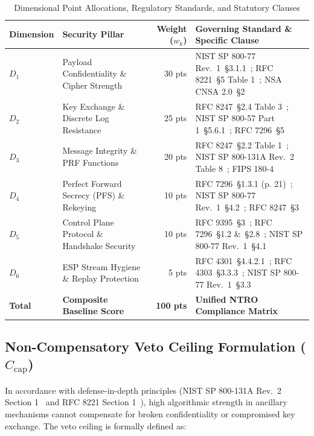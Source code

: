 \documentclass[11pt,a4paper]{article}
\begin{document}
\begin{table}[h!]
\centering
\small
\begin{tabularx}{\textwidth}{llrX}
\toprule
\textbf{Dimension} & \textbf{Security Pillar} & \textbf{Weight ($w_k$)} & \textbf{Governing Standard \& Specific Clause} \\
\midrule
$D_1$ & Payload Confidentiality \& Cipher Strength & 30 pts & NIST SP 800-77 Rev.~1~\S 3.1.1~\cite{nist800-77r1}; RFC 8221~\S 5 Table 1~\cite{rfc8221}; NSA CNSA 2.0~\S 2~\cite{cnsa2} \\
$D_2$ & Key Exchange \& Discrete Log Resistance & 25 pts & RFC 8247~\S 2.4 Table 3~\cite{rfc8247}; NIST SP 800-57 Part 1~\S 5.6.1~\cite{nist800-57p1r5}; RFC 7296~\S 5~\cite{rfc7296} \\
$D_3$ & Message Integrity \& PRF Functions & 20 pts & RFC 8247~\S 2.2 Table 1~\cite{rfc8247}; NIST SP 800-131A Rev.~2 Table 8~\cite{nist800-131ar2}; FIPS 180-4~\cite{fips180-4} \\
$D_4$ & Perfect Forward Secrecy (PFS) \& Rekeying & 10 pts & RFC 7296~\S 1.3.1 (p. 21)~\cite{rfc7296}; NIST SP 800-77 Rev.~1~\S 4.2~\cite{nist800-77r1}; RFC 8247~\S 3~\cite{rfc8247} \\
$D_5$ & Control Plane Protocol \& Handshake Security & 10 pts & RFC 9395~\S 3~\cite{rfc9395}; RFC 7296~\S 1.2 \&~\S 2.8~\cite{rfc7296}; NIST SP 800-77 Rev.~1~\S 4.1~\cite{nist800-77r1} \\
$D_6$ & ESP Stream Hygiene \& Replay Protection & 5 pts & RFC 4301~\S 4.4.2.1~\cite{rfc4301}; RFC 4303~\S 3.3.3~\cite{rfc4303}; NIST SP 800-77 Rev.~1~\S 3.3~\cite{nist800-77r1} \\
\midrule
\textbf{Total} & \textbf{Composite Baseline Score} & \textbf{100 pts} & \textbf{Unified NTRO Compliance Matrix} \\
\bottomrule
\end{tabularx}
\caption{Dimensional Point Allocations, Regulatory Standards, and Statutory Clauses}
\label{tab:weights}
\end{table}

\subsection{Non-Compensatory Veto Ceiling Formulation ($C_{\text{cap}}$)}
In accordance with defense-in-depth principles (NIST SP 800-131A Rev.~2 Section 1~\cite{nist800-131ar2} and RFC 8221 Section 1~\cite{rfc8221}), high algorithmic strength in ancillary mechanisms cannot compensate for broken confidentiality or compromised key exchange. The veto ceiling is formally defined as:
\end{document}
